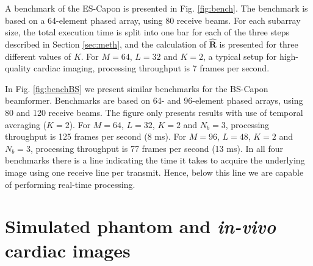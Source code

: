 \documentclass[journal]{IEEEtran}
\newcommand{\mat}[1]{\mathbf{#1}}
\begin{document}
A benchmark of the ES-Capon is presented in Fig. \ref{fig:bench}. The benchmark is based on a 64-element phased array, using 80 receive beams. For each subarray size, the total execution time is split into one bar for each of the three steps described in Section \ref{sec:meth}, and the calculation of $\mat{\hat{R}}$ is presented for three different values of $K$. For $M=64$, $L=32$ and $K=2$, a typical setup for high-quality cardiac imaging, processing throughput is 7 frames per second.

In Fig. \ref{fig:benchBS} we present similar benchmarks for the BS-Capon beamformer. Benchmarks are based on 64- and 96-element phased arrays, using 80 and 120 receive beams. The figure only presents results with use of temporal averaging ($K=2$). For $M=64$, $L=32$, $K=2$ and $N_b=3$, processing throughput is 125 frames per second (8 ms). For $M=96$, $L=48$, $K=2$ and $N_b=3$, processing throughput is 77 frames per second (13 ms). In all four benchmarks there is a line indicating the time it takes to acquire the underlying image using one receive line per transmit. Hence, below this line we are capable of performing real-time processing.

\section{Simulated phantom and \textit{in-vivo} cardiac images}\label{sec:images}
\end{document}
